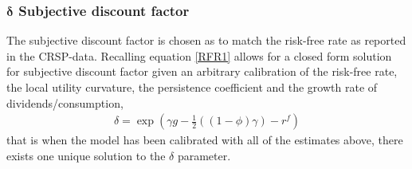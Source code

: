 \subsubsection{$\mathbf{\delta}$ Subjective discount factor}
The subjective discount factor is chosen as to match the risk-free rate as reported in the CRSP-data. 
Recalling equation \eqref{RFR1} allows for a closed form solution for subjective discount factor given an arbitrary calibration of the risk-free rate, the local utility curvature, the persistence coefficient and the growth rate of dividends/consumption,
\begin{align}
    \delta = \exp{\left( \gamma g - \frac{1}{2} \left( \left(1-\phi\right)\gamma  \right) - r^{f} \right)}
\end{align}
that is when the model has been calibrated with all of the estimates above, there exists one unique solution to the $\delta$ parameter.